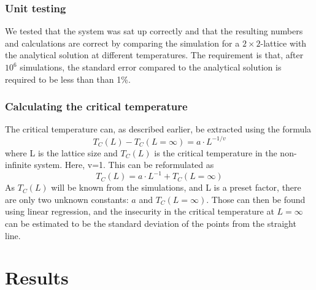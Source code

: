 \documentclass[10pt,a4paper]{article}
\begin{document}
\subsubsection{Unit testing}
We tested that the system was sat up correctly and that the resulting numbers and calculations are correct  by comparing the simulation for a $2\times2$-lattice with the analytical solution at different temperatures. The requirement is that, after $10^6$ simulations, the standard error compared to the analytical solution is required to be less than than 1\%.
\subsubsection{Calculating the critical temperature}
The critical temperature can, as described earlier, be extracted using the formula 
$$T_C(L)-T_C(L=\infty)=a\cdot L^{-1/v}$$
where L is the lattice size and $T_C(L)$ is the critical temperature in the non-infinite system. Here, v=1. This can be reformulated as 
$$T_C(L)=a\cdot L^{-1}+T_C(L=\infty)$$
As $T_C(L)$ will be known from the simulations, and L is a preset factor, there are only two unknown constants: $a$ and $T_C(L=\infty)$. Those can then be found using linear regression, and the insecurity in the critical temperature at $L=\infty$ can be estimated to be the standard deviation of the points from the straight line.
\section{Results}
\end{document}
